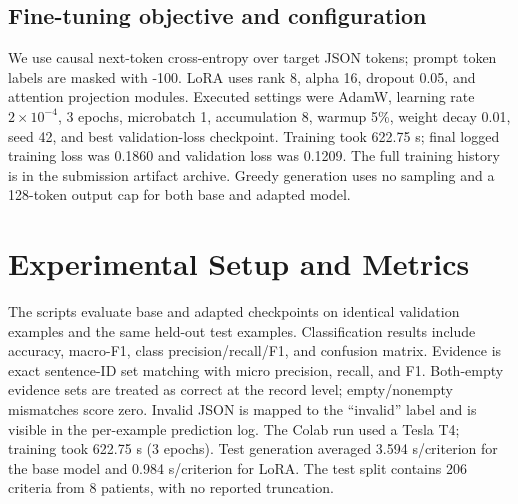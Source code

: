 \documentclass[conference]{IEEEtran}
\begin{document}
\subsection{Fine-tuning objective and configuration}
We use causal next-token cross-entropy over target JSON tokens; prompt token labels are masked with -100. LoRA uses rank 8, alpha 16, dropout 0.05, and attention projection modules. Executed settings were AdamW, learning rate $2\times10^{-4}$, 3 epochs, microbatch 1, accumulation 8, warmup 5\%, weight decay 0.01, seed 42, and best validation-loss checkpoint. Training took 622.75 s; final logged training loss was 0.1860 and validation loss was 0.1209. The full training history is in the submission artifact archive. Greedy generation uses no sampling and a 128-token output cap for both base and adapted model.
\section{Experimental Setup and Metrics}
The scripts evaluate base and adapted checkpoints on identical validation examples and the same held-out test examples. Classification results include accuracy, macro-F1, class precision/recall/F1, and confusion matrix. Evidence is exact sentence-ID set matching with micro precision, recall, and F1. Both-empty evidence sets are treated as correct at the record level; empty/nonempty mismatches score zero. Invalid JSON is mapped to the “invalid” label and is visible in the per-example prediction log. The Colab run used a Tesla T4; training took 622.75 s (3 epochs). Test generation averaged 3.594 s/criterion for the base model and 0.984 s/criterion for LoRA. The test split contains 206 criteria from 8 patients, with no reported truncation.
\end{document}
